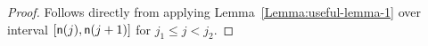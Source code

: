 \discretizationthm*
\begin{proof}
        Follows directly from applying Lemma~\ref{Lemma:useful-lemma-1} over interval $[\mathsf{n}(j), \mathsf{n}(j+1)]$ for $ j_1 \leq j < j_2$. 
\end{proof}


